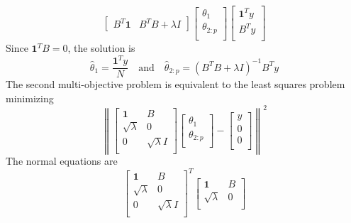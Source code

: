 \begin{enumerate}[label=(\alph*)]
\begin{tcolorbox}
$$\begin{bmatrix}
				      B^T \mathbf{1} & B^T B + \lambda I
			      \end{bmatrix}
			      \begin{bmatrix}
				      \theta_1     \\
				      \theta_{2:p} \\
			      \end{bmatrix}
			      \begin{bmatrix}
				      \mathbf{1}^T y \\
				      B^T y          \\
			      \end{bmatrix}
		      $$
		      Since $\mathbf{1}^T B = 0$, the solution is
		      $$
			      \hat{\theta}_1 = \frac{\mathbf{1}^T y}{N} \quad \text{and} \quad \hat{\theta}_{2:p} = (B^T B + \lambda I)^{-1} B^T y
		      $$
		      The second multi-objective problem is equivalent to the least
		      squares problem minimizing
		      $$ \left\|
			      \begin{bmatrix}
				      \mathbf{1}     & B                \\
				      \sqrt{\lambda} & 0                \\
				      0              & \sqrt{\lambda} I \\
			      \end{bmatrix}
			      \begin{bmatrix}
				      \theta_1     \\
				      \theta_{2:p} \\
			      \end{bmatrix}
			      -
			      \begin{bmatrix}
				      y \\
				      0 \\
				      0 \\
			      \end{bmatrix}
			      \right\|^2 $$
		      The normal equations are
		      $$
			      \begin{bmatrix}
				      \mathbf{1}     & B                \\
				      \sqrt{\lambda} & 0                \\
				      0              & \sqrt{\lambda} I \\
			      \end{bmatrix}^T
			      \begin{bmatrix}
				      \mathbf{1}     & B                \\
				      \sqrt{\lambda} & 0                \\

\end{bmatrix}$$
\end{tcolorbox}
\end{enumerate}
